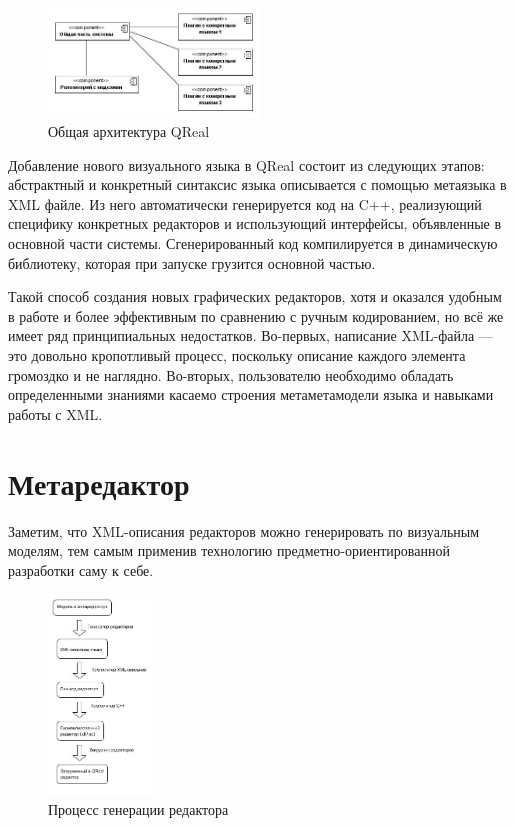 \documentclass[a4paper]{article}
\begin{document}
\begin{figure}[ht]
  \begin{center}
    \includegraphics[width=0.5\textwidth]{architecture.jpg}
    \caption{Общая архитектура QReal}
    \label{architecture}
  \end{center}
\end{figure}

Добавление нового визуального языка в QReal состоит из следующих этапов: абстрактный и конкретный синтаксис языка описывается с помощью метаязыка в XML файле. Из него автоматически генерируется код на C++, реализующий специфику конкретных редакторов и использующий интерфейсы, объявленные в основной части системы. Сгенерированный код компилируется в динамическую библиотеку, которая при запуске грузится основной частью.

Такой способ создания новых графических редакторов, хотя и оказался удобным в работе и более эффективным по сравнению с ручным кодированием, но всё же имеет ряд принципиальных недостатков. Во-первых, написание XML-файла --- это довольно кропотливый процесс, поскольку описание каждого элемента громоздко и не наглядно. Во-вторых, пользователю необходимо обладать определенными знаниями касаемо строения метаметамодели языка и навыками работы с XML.

\section{Метаредактор}

Заметим, что XML-описания редакторов можно генерировать по визуальным моделям, тем самым применив технологию предметно-ориентированной разработки саму к себе.

\begin{figure}[ht]
  \begin{center}
    \includegraphics[width=0.25\textwidth]{editorGeneration.jpg}
    \caption{Процесс генерации редактора}
    \label{editorGeneration}
  \end{center}
\end{figure}
\end{document}
